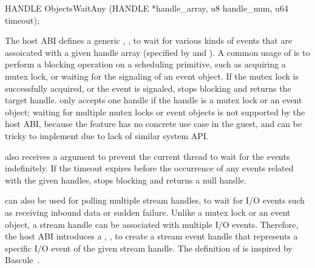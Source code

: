 




\begin{paldef}
HANDLE ObjectsWaitAny (HANDLE *handle_array,
                       u8 handle_num, u64 timeout);
\end{paldef}


The host ABI defines a generic \hostapi{},
, to wait for various kinds of events that are assoicated 
with a given handle array (specified by  and ).
A common usage of 
is to perform a blocking operation on a scheduling primitive,
such as acquiring a mutex lock,
or waiting for the signaling of an event object.
If the mutex lock is successfully acquired, or the event is signaled,
 stops blocking
and returns the target handle. 
 only accepts one handle if
the handle is a mutex lock or an event object;
waiting for multiple mutex locks or event objects is not supported by the host ABI,
because the feature has no concrete use case in the guest,
and can be tricky to implement due to lack of similar system API.



 also receives a  argument to prevent the current thread to wait for the events indefinitely.
If the timeout expires before the occurrence of any events related with the given handles,
 stops blocking
and returns a null handle.


 can also be used for polling multiple stream handles, to wait for I/O events
such as receiving inbound data or sudden failure.
Unlike a mutex lock or an event object, a stream handle can be associated
with multiple I/O events.
Therefore, the host ABI introduces a \hostapi{}, , to create a stream event handle
that represents a specific I/O event of the given stream handle.
The definition of  is inspired by Bascule~\cite{baumann13bascule}.



